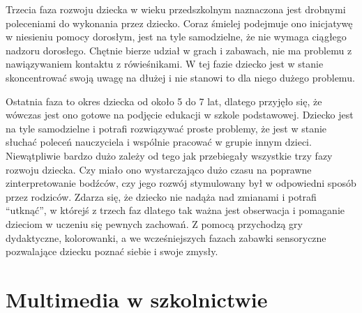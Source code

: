 \documentclass{article}
\begin{document}
	\par
	Trzecia faza rozwoju dziecka w wieku przedszkolnym naznaczona jest drobnymi poleceniami do wykonania przez dziecko. Coraz śmielej podejmuje ono inicjatywę w niesieniu pomocy dorosłym, jest na tyle samodzielne, że nie wymaga ciągłego nadzoru dorosłego. Chętnie bierze udział w grach i zabawach, nie ma problemu z nawiązywaniem kontaktu z rówieśnikami. W tej fazie dziecko jest w stanie skoncentrować swoją uwagę na dłużej i nie stanowi to dla niego dużego problemu.
	\par
	Ostatnia faza to okres dziecka od około 5 do 7 lat, dlatego przyjęło się, że wówczas jest ono gotowe na podjęcie edukacji w szkole podstawowej. Dziecko jest na tyle samodzielne i potrafi rozwiązywać proste problemy, że jest w stanie słuchać poleceń nauczyciela i wspólnie pracować w grupie innym dzieci. Niewątpliwie bardzo dużo zależy od tego jak przebiegały wszystkie trzy fazy rozwoju dziecka. Czy miało ono wystarczająco dużo czasu na poprawne zinterpretowanie bodźców, czy jego rozwój stymulowany był w odpowiedni sposób przez rodziców. Zdarza się, że dziecko nie nadąża nad zmianami i potrafi “utknąć”, w którejś z trzech faz dlatego tak ważna jest obserwacja i pomaganie dzieciom w uczeniu się pewnych zachowań. Z pomocą przychodzą gry dydaktyczne, kolorowanki, a we wcześniejszych fazach zabawki sensoryczne pozwalające dziecku poznać siebie i swoje zmysły.
	
	
	
	\section{Multimedia w szkolnictwie}
\end{document}
